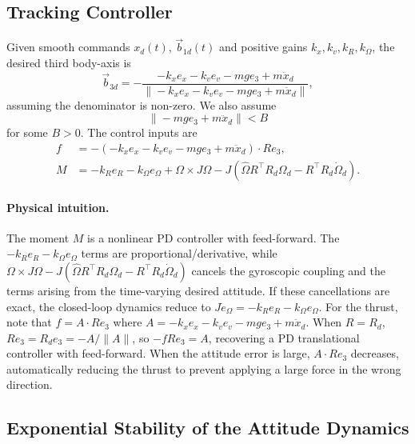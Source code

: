 \documentclass[11pt]{article}
\theoremstyle{remark}
\newcommand{\hatmap}[1]{\widehat{#1}}
\begin{document}
\subsection{Tracking Controller}
Given smooth commands $x_d(t)$, $\vec{b}_{1d}(t)$ and positive gains $k_x, k_v, k_R, k_\Omega$, the desired third body-axis is
\begin{equation}
    \vec{b}_{3d} = -\frac{-k_x e_x - k_v e_v - mge_3 + m\ddot{x}_d}{\|-k_x e_x - k_v e_v - mge_3 + m\ddot{x}_d\|},
    \label{eq:b3d}
\end{equation}
assuming the denominator is non-zero. We also assume
\begin{equation}
    \|-mge_3 + m\ddot{x}_d\| < B \label{eq:B_bound}
\end{equation}
for some $B>0$. The control inputs are
\begin{align}
    f &= -(-k_x e_x - k_v e_v - mge_3 + m\ddot{x}_d) \cdot Re_3, \label{eq:f} \\
    M &= -k_R e_R - k_\Omega e_\Omega + \Omega \times J\Omega - J(\hatmap{\Omega}R^\top R_d \Omega_d - R^\top R_d \dot{\Omega}_d). \label{eq:M}
\end{align}

\paragraph{Physical intuition.} The moment $M$ is a nonlinear PD controller with feed-forward. The $-k_R e_R - k_\Omega e_\Omega$ terms are proportional/derivative, while $\Omega \times J\Omega - J(\hatmap{\Omega}R^\top R_d\Omega_d - R^\top R_d \dot{\Omega}_d)$ cancels the gyroscopic coupling and the terms arising from the time-varying desired attitude. If these cancellations are exact, the closed-loop dynamics reduce to $J\dot e_\Omega = -k_R e_R - k_\Omega e_\Omega$. For the thrust, note that $f = A\cdot Re_3$ where $A = -k_x e_x - k_v e_v - mge_3 + m\ddot x_d$. When $R = R_d$, $Re_3 = R_d e_3 = -A/\|A\|$, so $-fRe_3 = A$, recovering a PD translational controller with feed-forward. When the attitude error is large, $A\cdot Re_3$ decreases, automatically reducing the thrust to prevent applying a large force in the wrong direction.

\subsection{Exponential Stability of the Attitude Dynamics}
\label{app:prop1}
\label{sec:prop1}
\end{document}
